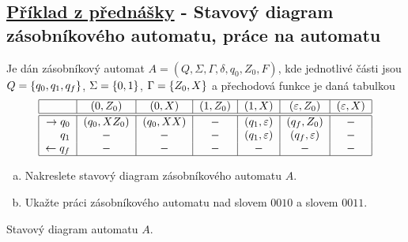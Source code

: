 \subsection{\href{https://youtu.be/UfLaDffSpQU?list=PLQL6z4JeTTQkLuzI78OTnfYBclE1g0UjS&t=3519}{Příklad z přednášky} - Stavový diagram zásobníkového automatu, práce na automatu}
Je dán zásobníkový automat $A = (Q, \Sigma, \Gamma, \delta, q_0, Z_0, F)$, kde jednotlivé části jsou 
$Q = \left\lbrace q_0, q_1, q_f \right\rbrace$, $\Sigma = \left\lbrace 0,1 \right\rbrace$, $\Gamma =\left\lbrace Z_0, X \right\rbrace$ a přechodová funkce je daná tabulkou
\[
\begin{tabular}{|r|c|c|c|c|c|c|}
    \hline
    & $(0, Z_0)$ & $(0, X)$ & $(1, Z_0)$ & $(1, X)$ & $(\varepsilon, Z_0)$ & $(\varepsilon, X)$ \\ \hline \hline
    $\rightarrow q_0$& $(q_0, X Z_0)$ & $(q_0, XX)$ & $-$ & $(q_1, \varepsilon)$ & $(q_f, Z_0)$ & $-$ \\
    $q_1$            & $-$            & $-$         & $-$ & $(q_1, \varepsilon)$ & $(q_f, \varepsilon)$ & $-$ \\
    $\leftarrow q_f$ & $-$& $-$& $-$ & $-$ & $-$ & $-$\\
    \hline
\end{tabular}
\]
\begin{enumerate}[a), noitemsep]
    \item Nakreslete stavový diagram zásobníkového automatu $A$.
    \item Ukažte práci zásobníkového automatu nad slovem $0010$ a slovem $0011$.
\end{enumerate}

Stavový diagram automatu $A$.
\begin{figure}[H]
    \centering
\end{figure}

